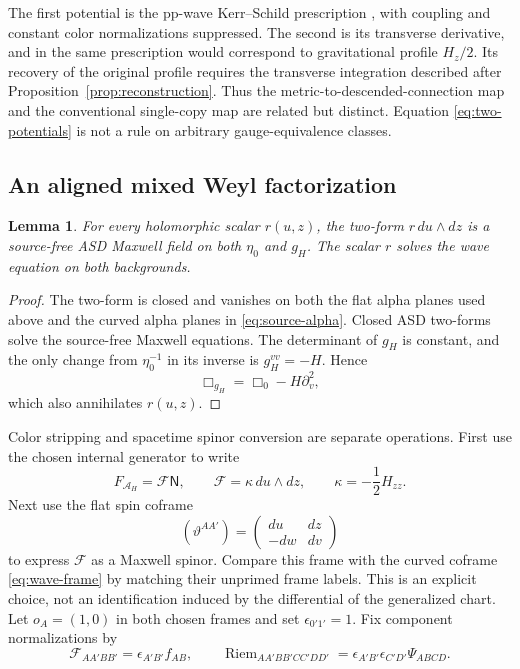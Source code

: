 \documentclass[11pt]{article}
\numberwithin{equation}{section}
\newtheorem{lemma}[theorem]{Lemma}
\theoremstyle{definition}
\theoremstyle{remark}
\newcommand{\Riem}{\operatorname{Riem}}
\newcommand{\NN}{\mathsf N}
\begin{document}
The first potential is the pp-wave Kerr--Schild prescription \cite[Section~5.1]{MOW}, with coupling and constant color normalizations suppressed. The second is its transverse derivative, and in the same prescription would correspond to gravitational profile $H_z/2$. Its recovery of the original profile requires the transverse integration described after Proposition~\ref{prop:reconstruction}. Thus the metric-to-descended-connection map and the conventional single-copy map are related but distinct. Equation \eqref{eq:two-potentials} is not a rule on arbitrary gauge-equivalence classes.

\subsection{An aligned mixed Weyl factorization}

\begin{lemma}\label{lem:aligned-fields}
For every holomorphic scalar $r(u,z)$, the two-form $r\,du\wedge dz$ is a source-free ASD Maxwell field on both $\eta_0$ and $g_H$. The scalar $r$ solves the wave equation on both backgrounds.
\end{lemma}
\begin{proof}
The two-form is closed and vanishes on both the flat alpha planes used above and the curved alpha planes in \eqref{eq:source-alpha}. Closed ASD two-forms solve the source-free Maxwell equations. The determinant of $g_H$ is constant, and the only change from $\eta_0^{-1}$ in its inverse is $g_H^{vv}=-H$. Hence
\begin{equation}\label{eq:curvedbox}
\Box_{g_H}=\Box_0-H\partial_v^2,
\end{equation}
which also annihilates $r(u,z)$.
\end{proof}

Color stripping and spacetime spinor conversion are separate operations. First use the chosen internal generator to write
\begin{equation}\label{eq:color-strip}
F_{\mathcal A_H}=\mathcal F\NN,
\qquad \mathcal F=\kappa\,du\wedge dz,
\qquad \kappa=-\frac12H_{zz}.
\end{equation}
Next use the flat spin coframe
\begin{equation}\label{eq:flat-spin-frame}
(\vartheta^{AA'})=\begin{pmatrix}du&dz\\-dw&dv\end{pmatrix}
\end{equation}
to express $\mathcal F$ as a Maxwell spinor. Compare this frame with the curved coframe \eqref{eq:wave-frame} by matching their unprimed frame labels. This is an explicit choice, not an identification induced by the differential of the generalized chart. Let $o_A=(1,0)$ in both chosen frames and set $\epsilon_{0'1'}=1$. Fix component normalizations by
\begin{equation}\label{eq:Weyl-normalizations}
\mathcal F_{AA'BB'}=\epsilon_{A'B'}f_{AB},
\qquad
\Riem_{AA'BB'CC'DD'}=
\epsilon_{A'B'}\epsilon_{C'D'}\Psi_{ABCD}.
\end{equation}
\end{document}
